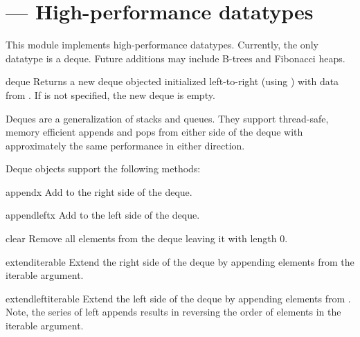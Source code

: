 \section{ ---
         High-performance datatypes}



This module implements high-performance datatypes.  Currently, the
only datatype is a deque.  Future additions may include B-trees
and Fibonacci heaps.

\begin{funcdesc}{deque}{}
  Returns a new deque objected initialized left-to-right (using
  ) with data from .  If 
  is not specified, the new deque is empty.

  Deques are a generalization of stacks and queues.  They support
  thread-safe, memory efficient appends and pops from either side of the
  deque with approximately the same performance in either direction.
\end{funcdesc}

Deque objects support the following methods:

\begin{methoddesc}{append}{x}
   Add  to the right side of the deque.
\end{methoddesc}

\begin{methoddesc}{appendleft}{x}
   Add  to the left side of the deque.
\end{methoddesc}

\begin{methoddesc}{clear}{}
   Remove all elements from the deque leaving it with length 0.
\end{methoddesc}

\begin{methoddesc}{extend}{iterable}
   Extend the right side of the deque by appending elements from
   the iterable argument.
\end{methoddesc}

\begin{methoddesc}{extendleft}{iterable}
   Extend the left side of the deque by appending elements from
   .  Note, the series of left appends results in
   reversing the order of elements in the iterable argument.
\end{methoddesc}

